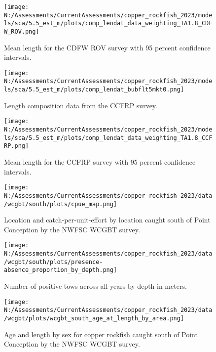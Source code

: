\documentclass[11pt,
  english,
  letterpaper,
]{article}
\begin{document}
\begin{figure}
\centering
\texttt{[image: N:/Assessments/CurrentAssessments/copper\_rockfish\_2023/models/sca/5.5\_est\_m/plots/comp\_lendat\_data\_weighting\_TA1.8\_CDFW\_ROV.png]}
\caption{Mean length for the CDFW ROV survey with 95 percent confidence intervals.\label{fig:mean-rov-len-data}}
\end{figure}

\begin{figure}
\centering
\texttt{[image: N:/Assessments/CurrentAssessments/copper\_rockfish\_2023/models/sca/5.5\_est\_m/plots/comp\_lendat\_bubflt5mkt0.png]}
\caption{Length composition data from the CCFRP survey.\label{fig:ccfrp-len-data}}
\end{figure}

\begin{figure}
\centering
\texttt{[image: N:/Assessments/CurrentAssessments/copper\_rockfish\_2023/models/sca/5.5\_est\_m/plots/comp\_lendat\_data\_weighting\_TA1.8\_CCFRP.png]}
\caption{Mean length for the CCFRP survey with 95 percent confidence intervals.\label{fig:mean-ccfrp-len-data}}
\end{figure}

\begin{figure}
\centering
\texttt{[image: N:/Assessments/CurrentAssessments/copper\_rockfish\_2023/data/wcgbt/south/plots/cpue\_map.png]}
\caption{Location and catch-per-unit-effort by location caught south of Point Conception by the NWFSC WCGBT survey.\label{fig:wcgbt-cpue}}
\end{figure}

\begin{figure}
\centering
\texttt{[image: N:/Assessments/CurrentAssessments/copper\_rockfish\_2023/data/wcgbt/south/plots/presence-absence\_proportion\_by\_depth.png]}
\caption{Number of positive tows across all years by depth in meters.\label{fig:wcgbt-depth}}
\end{figure}

\begin{figure}
\centering
\texttt{[image: N:/Assessments/CurrentAssessments/copper\_rockfish\_2023/data/wcgbt/plots/wcgbt\_south\_age\_at\_length\_by\_area.png]}
\caption{Age and length by sex for copper rockfish caught south of Point Conception by the NWFSC WCGBT survey.\label{fig:wcgbt-len-age}}
\end{figure}
\end{document}
